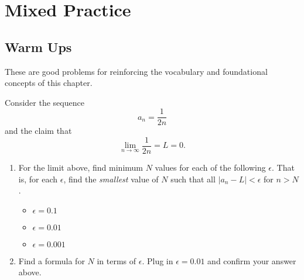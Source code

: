 \section{Mixed Practice}

\subsection{Warm Ups}
These are good problems for reinforcing the vocabulary and foundational concepts of this chapter.

\begin{exercise}{\Coffeecup }

 Consider the sequence $$a_n=\frac{1}{2n} $$ and the claim that $$\lim_{n\rightarrow\infty}\frac{1}{2n}=L=0. $$

\begin{enumerate}[label=\alph*.)] \item For the limit above, find minimum $N$ values for each of the following $\epsilon$.  That is, for each $\epsilon$, find the \emph{smallest} value of $N$ such that all $\left|a_n-L\right|<\epsilon$ for $n>N$. \begin{itemize}
\item $\epsilon=0.1$ \vspace{.1in} \item $\epsilon=0.01$ \vspace{.1in}  \item $\epsilon=0.001$
\end{itemize}
\item Find a formula for $N$ in terms of $\epsilon$.  Plug in $\epsilon=0.01$ and confirm your answer above.

\end{enumerate}
\end{exercise}

